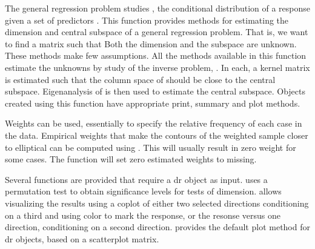 \begin{Details}\relax
The general regression problem studies , the conditional
distribution of a response  given a set of predictors .  
This function provides methods for estimating the dimension and central
subspace of a general regression problem.  That is, we want to find a 
 matrix  such that 
Both the dimension  and the subspace
 are unknown.  These methods make few assumptions.  All the methods
available in this function estimate the unknowns by study of the inverse
problem, .  In each, a kernel matrix  is estimated such
that the column space of  should be close to the central subspace.
Eigenanalysis of  is then used to estimate the central subspace.
Objects created using this function have appropriate print, summary and plot
methods.

Weights can be used, essentially to specify the relative 
frequency of each case in the data.  Empirical weights that make 
the contours of the weighted sample closer to elliptical can be 
computed using .  
This will usually result in zero weight for some 
cases.  The function will set zero estimated weights to missing.

Several functions are provided that require a dr object as input.  
 uses a permutation test to obtain significance levels
for tests of dimension.   allows visualizing the results using a
coplot of either two selected directions conditioning on a third and using
color to mark the response, or the resonse versus one direction,
conditioning on a second direction.   provides the default plot
method for dr objects, based on a scatterplot matrix.
\end{Details}
